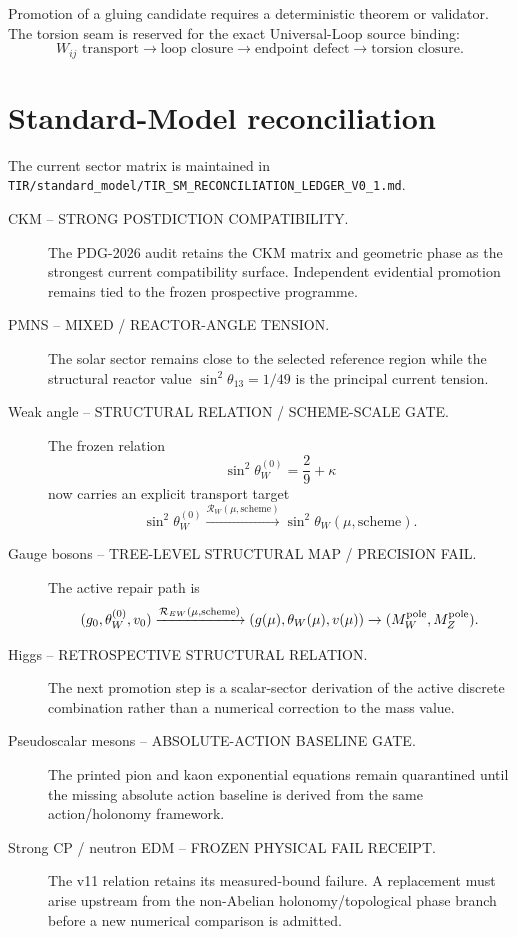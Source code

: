 Promotion of a gluing candidate requires a deterministic theorem or validator.
The torsion seam is reserved for the exact Universal-Loop source binding:
\[
W_{ij}\text{ transport}
\to\text{loop closure}
\to\text{endpoint defect}
\to\text{torsion closure}.
\]

\section{Standard-Model reconciliation}

The current sector matrix is maintained in
\texttt{TIR/standard\_model/TIR\_SM\_RECONCILIATION\_LEDGER\_V0\_1.md}.

\begin{description}
  \item[CKM -- STRONG POSTDICTION COMPATIBILITY.]
  The PDG-2026 audit retains the CKM matrix and geometric phase as the strongest
  current compatibility surface.  Independent evidential promotion remains tied
  to the frozen prospective programme.

  \item[PMNS -- MIXED / REACTOR-ANGLE TENSION.]
  The solar sector remains close to the selected reference region while the
  structural reactor value $\sin^2\theta_{13}=1/49$ is the principal current
  tension.

  \item[Weak angle -- STRUCTURAL RELATION / SCHEME-SCALE GATE.]
  The frozen relation
  \[
  \sin^2\theta_W^{(0)}=\frac29+\kappa
  \]
  now carries an explicit transport target
  \[
  \sin^2\theta_W^{(0)}
  \xrightarrow{\mathcal R_W(\mu,\mathrm{scheme})}
  \sin^2\theta_W(\mu,\mathrm{scheme}).
  \]

  \item[Gauge bosons -- TREE-LEVEL STRUCTURAL MAP / PRECISION FAIL.]
  The active repair path is
  \[
  (g_0,\theta_W^{(0)},v_0)
  \xrightarrow{\mathcal R_{EW}(\mu,\mathrm{scheme})}
  (g(\mu),\theta_W(\mu),v(\mu))
  \to(M_W^{\rm pole},M_Z^{\rm pole}).
  \]

  \item[Higgs -- RETROSPECTIVE STRUCTURAL RELATION.]
  The next promotion step is a scalar-sector derivation of the active discrete
  combination rather than a numerical correction to the mass value.

  \item[Pseudoscalar mesons -- ABSOLUTE-ACTION BASELINE GATE.]
  The printed pion and kaon exponential equations remain quarantined until the
  missing absolute action baseline is derived from the same action/holonomy
  framework.

  \item[Strong CP / neutron EDM -- FROZEN PHYSICAL FAIL RECEIPT.]
  The v11 relation retains its measured-bound failure.  A replacement must arise
  upstream from the non-Abelian holonomy/topological phase branch before a new
  numerical comparison is admitted.
\end{description}

